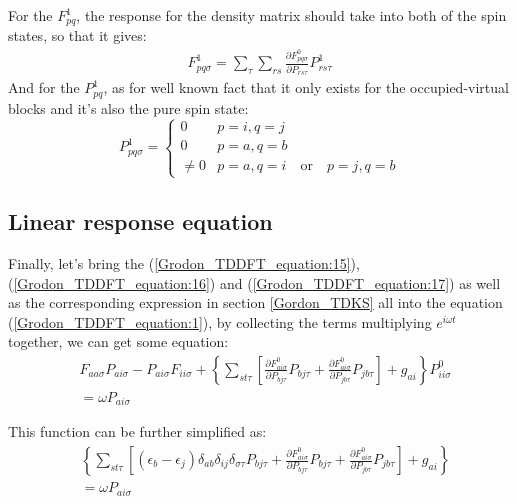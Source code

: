 For the $F^{1}_{pq}$, the response for the density matrix should take
into both of the spin states, so that it gives:
\begin{align}
   \label{Grodon_TDDFT_equation:16}
F^{1}_{pq\sigma} = \sum_{\tau}\sum_{rs}\frac{\partial
F^{0}_{pq\sigma}}{\partial
P_{rs\tau}}P^{1}_{rs\tau} 
\end{align}
And for the $P^{1}_{pq}$, as for well known fact that it only exists
for the occupied-virtual blocks and it's also the pure spin state:
\begin{equation}
  \label{Grodon_TDDFT_equation:17}
P^{1}_{pq\sigma} = 
\begin{cases}
0 & p=i, q= j \\
0 & p=a, q= b \\
\neq 0 & p=a, q = i \quad \text{or} \quad p = j, q = b              
\end{cases}
\end{equation} 

\subsection{Linear response equation}
%
%
%
Finally, let's bring the (\ref{Grodon_TDDFT_equation:15}),
(\ref{Grodon_TDDFT_equation:16}) and 
(\ref{Grodon_TDDFT_equation:17}) as well as the corresponding
expression in section \ref{Gordon_TDKS} all into the equation
(\ref{Grodon_TDDFT_equation:1}), by collecting the terms multiplying
$e^{i\omega t}$ together, we can get some equation:
\begin{align}
 \label{Grodon_TDDFT_equation:18}
&F_{aa\sigma}P_{ai\sigma} - P_{ai\sigma}F_{ii\sigma} + \left\lbrace 
\sum_{st\tau}\left[\frac{\partial
F^{0}_{ai\sigma}}{\partial
P_{bj\tau}}P_{bj\tau} + \frac{\partial
F^{0}_{ai\sigma}}{\partial
P_{jb\tau}}P_{jb\tau} \right] 
+ g_{ai} \right\rbrace P^{0}_{ii\sigma} \nonumber \\
&=\omega P_{ai\sigma}
\end{align}

This function can be further simplified as:
\begin{align}
 \label{Grodon_TDDFT_equation:19}
&\left\lbrace 
\sum_{st\tau}\left[(\epsilon_{b} -
\epsilon_{j})
\delta_{ab}\delta_{ij}\delta_{\sigma\tau}P_{bj\tau} +
\frac{\partial
F^{0}_{ai\sigma}}{\partial
P_{bj\tau}}P_{bj\tau} + \frac{\partial
F^{0}_{ai\sigma}}{\partial
P_{jb\tau}}P_{jb\tau} \right] 
+ g_{ai} \right\rbrace \nonumber \\
&=\omega P_{ai\sigma}
\end{align}


